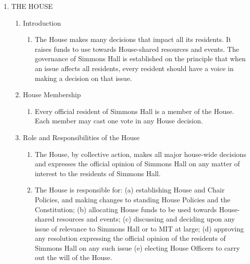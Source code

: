 \documentclass[letterpaper]{article}
\begin{document}
\begin{enumerate}
\begin{enumerate}
\begin{enumerate}
\end{enumerate}

\end{enumerate}

\item THE HOUSE 

\begin{enumerate}

\item Introduction 

\begin{enumerate}

\item The House makes many decisions that impact all its residents. It raises funds to use towards House-shared resources and events. The governance of Simmons Hall is established on the principle that when an issue affects all residents, every resident should have a voice in making a decision on that issue. 

\end{enumerate}

\item House Membership 

\begin{enumerate}

\item Every official resident of Simmons Hall is a member of the House. Each member may cast one vote in any House decision.

\end{enumerate}

\item Role and Responsibilities of the House 

\begin{enumerate}

\item The House, by collective action, makes all major house-wide decisions and expresses the official opinion of Simmons Hall on any matter of interest to the residents of Simmons Hall.

\item The House is responsible for: (a) establishing House and Chair Policies, and making changes to standing House Policies and the Constitution; (b) allocating House funds to be used towards House-shared resources and events; (c) discussing and deciding upon any issue of relevance to Simmons Hall or to MIT at large; (d) approving any resolution expressing the official opinion of the residents of Simmons Hall on any such issue (e) electing House Officers to carry out the will of the House.


\end{enumerate}
\end{enumerate}
\end{enumerate}
\end{document}
